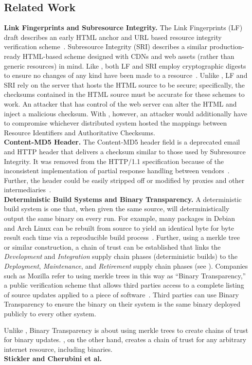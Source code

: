 \subsection{Related Work}

\noindent\textbf{Link Fingerprints and Subresource Integrity.} The Link
Fingerprints (LF) draft describes an early HTML anchor and URL based resource
integrity verification scheme~\cite{LF}. Subresource Integrity (SRI) describes a
similar production-ready HTML-based scheme designed with CDNs and web assets
(rather than generic resources) in mind. Like \SYSTEM{}, both LF and SRI employ
cryptographic digests to ensure no changes of any kind have been made to a
resource~\cite{SRI}. Unlike \SYSTEM{}, LF and SRI rely on the server that hosts
the HTML source to be secure; specifically, the checksums contained in the HTML
source must be accurate for these schemes to work. An attacker that has control
of the web server can alter the HTML and inject a malicious checksum. With
\SYSTEM{}, however, an attacker would additionally have to compromise whichever
distributed system hosted the mappings between Resource Identifiers and
Authoritative Checksums. \\

\noindent\textbf{Content-MD5 Header.} The Content-MD5 header field is a
deprecated email and HTTP header that delivers a checksum similar to those used
by Subresource Integrity. It was removed from the HTTP/1.1 specification because
of the inconsistent implementation of partial response handling between
vendors~\cite{HTTP1.1}. Further, the header could be easily stripped off or
modified by proxies and other intermediaries~\cite{MD5Header}. \\

\noindent\textbf{Deterministic Build Systems and Binary Transparency.} A
deterministic build system is one that, when given the same source, will
deterministically output the same binary on every run. For example, many
packages in Debian~\cite{ReproBuildsDebian} and Arch Linux can be rebuilt from
source to yield an identical byte for byte result each time via a reproducible
build process~\cite{ReproBuilds}. Further, using a merkle tree~\cite{MerkleTree}
or similar construction, a chain of trust can be established that links the
\emph{Development} and \emph{Integration} supply chain phases (deterministic
builds) to the \emph{Deployment}, \emph{Maintenance}, and \emph{Retirement}
supply chain phases (see ). Companies such as Mozilla refer to
using merkle trees in this way as ``Binary Transparency,'' a public verification
scheme that allows third parties access to a complete listing of source updates
applied to a piece of software~\cite{BinaryTransparency}. Third parties can use
Binary Transparency to ensure the binary on their system is the same binary
deployed publicly to every other system.

Unlike \SYSTEM{}, Binary Transparency is about using merkle trees to create
chains of trust for binary updates. \SYSTEM{}, on the other hand, creates a
chain of trust for any arbitrary internet resource, including binaries.\\

\noindent\textbf{Stickler and Cherubini et al.}  \\
